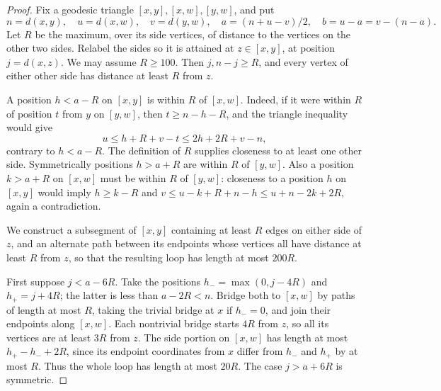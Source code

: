 \begin{proof}
Fix a geodesic triangle $[x,y],[x,w],[y,w]$, and put
\[
 n=d(x,y),\quad u=d(x,w),\quad v=d(y,w),\quad
 a=(n+u-v)/2,\quad b=u-a=v-(n-a).
\]
Let $R$ be the maximum, over its side vertices, of distance to the vertices
on the other two sides.  Relabel the sides so it is attained at
$z\in[x,y]$, at position $j=d(x,z)$.  We may assume $R\ge100$.  Then
$j,n-j\ge R$, and every vertex of either other side has distance at least
$R$ from $z$.

A position $h<a-R$ on $[x,y]$ is within $R$ of $[x,w]$.  Indeed, if it
were within $R$ of position $t$ from $y$ on $[y,w]$, then
$t\ge n-h-R$, and the triangle inequality would give
\[
 u\le h+R+v-t\le2h+2R+v-n,
\]
contrary to $h<a-R$.  The definition of $R$ supplies closeness to at least
one other side.  Symmetrically positions $h>a+R$ are within $R$ of
$[y,w]$.  Also a position $k>a+R$ on $[x,w]$ must be within $R$ of
$[y,w]$: closeness to a position $h$ on $[x,y]$ would imply $h\ge k-R$
and
$v\le u-k+R+n-h\le u+n-2k+2R$, again a contradiction.

We construct a subsegment of $[x,y]$ containing at least $R$ edges on
either side of $z$, and an alternate path between its endpoints whose
vertices all have distance at least $R$ from $z$, so that the resulting
loop has length at most $200R$.

First suppose $j<a-6R$.  Take the positions
$h_- =\max(0,j-4R)$ and $h_+=j+4R$; the latter is less than $a-2R<n$.
Bridge both to $[x,w]$ by paths of length at most $R$, taking the trivial
bridge at $x$ if $h_-=0$, and join their endpoints along $[x,w]$.
Each nontrivial bridge starts $4R$ from $z$, so all its vertices are at
least $3R$ from $z$.  The side portion on $[x,w]$ has length at most
$h_+-h_-+2R$, since its endpoint coordinates from $x$ differ from $h_-$
and $h_+$ by at most $R$.  Thus the whole loop has length at most $20R$.
The case $j>a+6R$ is symmetric.


\end{proof}
